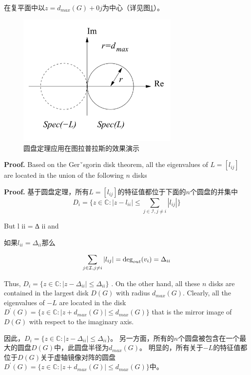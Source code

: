 \documentclass{article}
\begin{document}
\noindent 在复平面中以$z=d_{max}(G)+0j$为中心（详见图\ref{DiskTheorem}）。

\begin{figure}[htbp]
    \centering
    \includegraphics[width=8cm]{figures/Fig1-DiskTheorem.jpeg}
    \caption{圆盘定理应用在图拉普拉斯的效果演示}
    \label{DiskTheorem}
\end{figure}

{\color[gray]{0.5}
\noindent \textbf{Proof.}  Based on the Gerˇsgorin disk theorem, all the eigenvalues of $L=[l_{ij}]$ are located in the union of the following $n$ disks
}

\noindent \textbf{Proof.} 基于圆盘定理，所有$L=[l_{ij}]$的特征值都位于下面的$n$个圆盘的并集中
\begin{equation}
    D_i = \{ z\in \mathbb{C}: |z-l_{ii}| \le \sum_{j\in \mathcal{I},j\ne i}|l_{ij}| \}
    \tag{16}
    \label{16}
\end{equation}

{\color[gray]{0.5}
But l ii = ∆ ii and
}

如果$l_{ii} = \Delta_{ii}$那么

\begin{equation}
    \sum_{j\in \mathcal{I},j\ne i}|l_{ij}|=\deg_{out}(v_i) = \Delta_{ii}
    \notag
\end{equation}

{\color[gray]{0.5}
\noindent Thus, $D_i = \{ z\in \mathbb{C}:|z - \Delta_{ii}| \le \Delta_{ii}\}$ . 
On the other hand, all these $n$ disks are contained in the largest disk $D(G)$ with radius $d_{max}(G)$. 
Clearly, all the eigenvalues of $−L$ are located in the disk $D^\prime(G)=\{ z\in \mathbb{C}: |z+d_{max}(G)|\le d_{max}(G)\}$ that is the mirror image of $D(G)$ with respect to the imaginary axis.
}

\noindent 因此，$D_i = \{ z\in \mathbb{C}:|z - \Delta_{ii}| \le \Delta_{ii}\}$。
另一方面，所有的$n$个圆盘被包含在一个最大的圆盘$D(G)$中，此圆盘半径为$d_{max}(G)$。
明显的，所有关于$-L$的特征值都位于$D(G)$关于虚轴镜像对阵的圆盘$D^\prime(G)=\{ z\in \mathbb{C}: |z+d_{max}(G)|\le d_{max}(G)\}$中。
\end{document}
